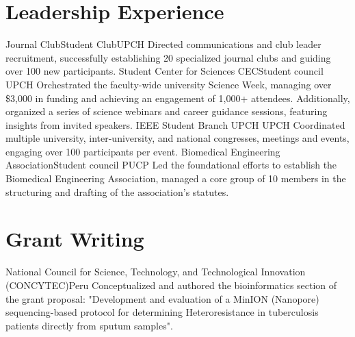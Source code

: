 \documentclass[11pt,a4paper,sans]{moderncv}
\begin{document}
\section{Leadership Experience}
  {Journal Club}{Student Club}{UPCH}
  {{\footnotesize Directed communications and club leader recruitment, successfully establishing 20 specialized journal clubs and guiding over 100 new participants.}}
  {Student Center for Sciences CEC}{Student council}
  {UPCH}
  {{\footnotesize Orchestrated the faculty-wide university Science Week, managing over \$3,000 in funding and achieving an engagement of 1,000+ attendees. Additionally, organized a series of science webinars and career guidance sessions, featuring insights from invited speakers.}}
  {IEEE Student Branch UPCH}{}
  {UPCH}
  {Coordinated multiple university, inter-university, and national congresses, meetings and events, engaging over 100 participants per event.
  }
  {Biomedical Engineering Association}{Student council}
  {PUCP}
  {Led the foundational efforts to establish the Biomedical Engineering Association, managed a core group of 10 members in the structuring and drafting of the association’s statutes.
  }



\section{Grant Writing}
  {National Council for Science, Technology, and Technological Innovation (CONCYTEC)}{Peru}
  {}
  {Conceptualized and authored the bioinformatics section of the grant proposal: "Development and evaluation of a MinION (Nanopore) sequencing-based protocol for determining
Heteroresistance in tuberculosis patients directly from sputum samples".
}
\end{document}
